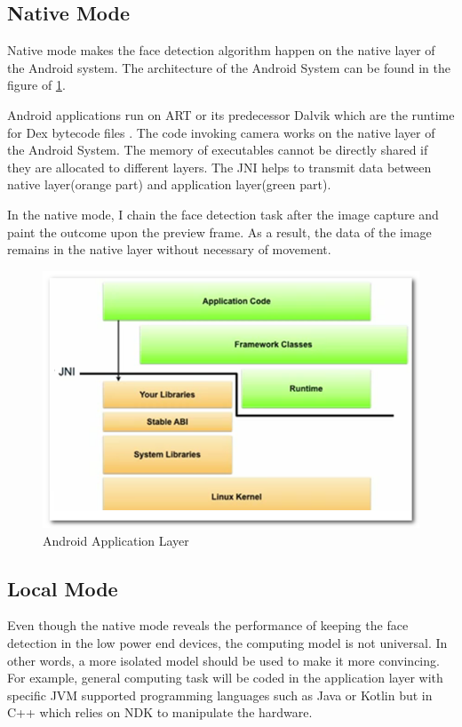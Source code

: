 \subsection{Native Mode}
Native mode makes the face detection algorithm happen on the native layer of the Android system. The architecture of the Android System can be found in the figure of \ref{fig:android_application_layer}.

Android applications run on ART or its predecessor Dalvik which are the runtime for Dex bytecode files \cite{android-art}. The code invoking camera works on the native layer of the Android System. The memory of executables cannot be directly shared if they are allocated to different layers. The JNI helps to transmit data between native layer(orange part) and application layer(green part).

In the native mode, I chain the face detection task after the image capture and paint the outcome upon the preview frame. As a result, the data of the image remains in the native layer without necessary of movement.


\begin{figure}
    \centering
    \includegraphics[width=\textwidth]{images/jni.jpg}
    \caption{Android Application Layer}
    \label{fig:android_application_layer}
\end{figure}

\subsection{Local Mode}
Even though the native mode reveals the performance of keeping the face detection in the low power end devices, the computing model is not universal. In other words, a more isolated model should be used to make it more convincing. For example, general computing task will be coded in the application layer with specific JVM supported programming languages such as Java or Kotlin but in C++ which relies on NDK to manipulate the hardware. 

